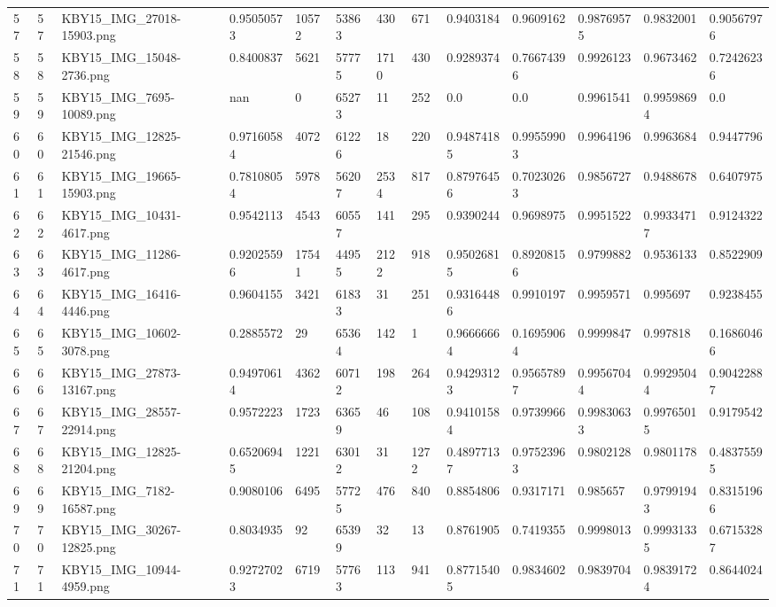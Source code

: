 \documentclass[11pt, a4paper, twoside]{report}
\begin{document}
\begin{longtable}[c]{@{}lllllllllllll@{}}
57 & 57 & KBY15\_IMG\_27018-15903.png & 0.95050573 & 10572 & 53863 & 430 & 671 & 0.9403184 & 0.9609162 & 0.98769575 & 0.9832001 & 0.90567976 \\
58 & 58 & KBY15\_IMG\_15048-2736.png & 0.8400837 & 5621 & 57775 & 1710 & 430 & 0.9289374 & 0.76674396 & 0.9926123 & 0.9673462 & 0.72426236 \\
59 & 59 & KBY15\_IMG\_7695-10089.png & nan & 0 & 65273 & 11 & 252 & 0.0 & 0.0 & 0.9961541 & 0.99598694 & 0.0 \\
60 & 60 & KBY15\_IMG\_12825-21546.png & 0.97160584 & 4072 & 61226 & 18 & 220 & 0.94874185 & 0.99559903 & 0.9964196 & 0.9963684 & 0.9447796 \\
61 & 61 & KBY15\_IMG\_19665-15903.png & 0.78108054 & 5978 & 56207 & 2534 & 817 & 0.87976456 & 0.70230263 & 0.9856727 & 0.9488678 & 0.6407975 \\
62 & 62 & KBY15\_IMG\_10431-4617.png & 0.9542113 & 4543 & 60557 & 141 & 295 & 0.9390244 & 0.9698975 & 0.9951522 & 0.99334717 & 0.9124322 \\
63 & 63 & KBY15\_IMG\_11286-4617.png & 0.92025596 & 17541 & 44955 & 2122 & 918 & 0.95026815 & 0.89208156 & 0.9799882 & 0.9536133 & 0.8522909 \\
64 & 64 & KBY15\_IMG\_16416-4446.png & 0.9604155 & 3421 & 61833 & 31 & 251 & 0.93164486 & 0.9910197 & 0.9959571 & 0.995697 & 0.9238455 \\
65 & 65 & KBY15\_IMG\_10602-3078.png & 0.2885572 & 29 & 65364 & 142 & 1 & 0.96666664 & 0.16959064 & 0.9999847 & 0.997818 & 0.16860466 \\
66 & 66 & KBY15\_IMG\_27873-13167.png & 0.94970614 & 4362 & 60712 & 198 & 264 & 0.94293123 & 0.95657897 & 0.99567044 & 0.99295044 & 0.90422887 \\
67 & 67 & KBY15\_IMG\_28557-22914.png & 0.9572223 & 1723 & 63659 & 46 & 108 & 0.94101584 & 0.9739966 & 0.99830633 & 0.99765015 & 0.9179542 \\
68 & 68 & KBY15\_IMG\_12825-21204.png & 0.65206945 & 1221 & 63012 & 31 & 1272 & 0.48977137 & 0.97523963 & 0.9802128 & 0.9801178 & 0.48375595 \\
69 & 69 & KBY15\_IMG\_7182-16587.png & 0.9080106 & 6495 & 57725 & 476 & 840 & 0.8854806 & 0.9317171 & 0.985657 & 0.97991943 & 0.83151966 \\
70 & 70 & KBY15\_IMG\_30267-12825.png & 0.8034935 & 92 & 65399 & 32 & 13 & 0.8761905 & 0.7419355 & 0.9998013 & 0.99931335 & 0.67153287 \\
71 & 71 & KBY15\_IMG\_10944-4959.png & 0.92727023 & 6719 & 57763 & 113 & 941 & 0.87715405 & 0.9834602 & 0.9839704 & 0.98391724 & 0.8644024 \\

\end{longtable}
\end{document}
